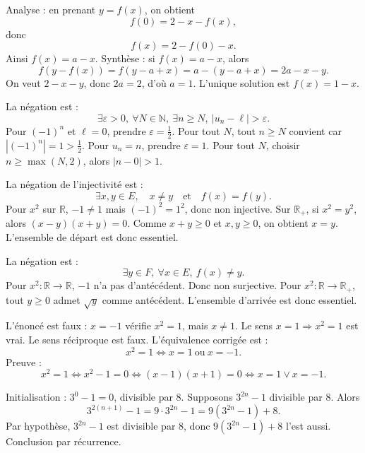 \documentclass[11pt,a4paper]{article}
\newcommand{\N}{\mathbb{N}}
\newcommand{\R}{\mathbb{R}}
\newcommand{\ou}{\vee}
\newcommand{\imp}{\Rightarrow}
\newcommand{\ssi}{\Longleftrightarrow}
\newcommand{\eps}{\varepsilon}
\begin{document}
\begin{correctionbox}[PREP 34]
Analyse : en prenant \(y=f(x)\), on obtient
\[
f(0)=2-x-f(x),
\]
donc
\[
f(x)=2-f(0)-x.
\]
Ainsi \(f(x)=a-x\). Synthèse : si \(f(x)=a-x\), alors
\[
f(y-f(x))=f(y-a+x)=a-(y-a+x)=2a-x-y.
\]
On veut \(2-x-y\), donc \(2a=2\), d'où \(a=1\). L'unique solution est \(f(x)=1-x\).
\end{correctionbox}

\begin{correctionbox}[PREP 35]
La négation est :
\[
\exists \eps>0,\ \forall N\in\N,\ \exists n\geq N,\ |u_n-\ell|>\eps.
\]
Pour \((-1)^n\) et \(\ell=0\), prendre \(\eps=\frac12\). Pour tout \(N\), tout \(n\geq N\) convient car \(|(-1)^n|=1>\frac12\). Pour \(u_n=n\), prendre \(\eps=1\). Pour tout \(N\), choisir \(n\geq\max(N,2)\), alors \(|n-0|>1\).
\end{correctionbox}

\begin{correctionbox}[PREP 36]
La négation de l'injectivité est :
\[
\exists x,y\in E,\quad x\neq y\quad\text{et}\quad f(x)=f(y).
\]
Pour \(x^2\) sur \(\R\), \(-1\neq1\) mais \((-1)^2=1^2\), donc non injective. Sur \(\R_+\), si \(x^2=y^2\), alors \((x-y)(x+y)=0\). Comme \(x+y\geq0\) et \(x,y\geq0\), on obtient \(x=y\). L'ensemble de départ est donc essentiel.
\end{correctionbox}

\begin{correctionbox}[PREP 37]
La négation est :
\[
\exists y\in F,\ \forall x\in E,\ f(x)\neq y.
\]
Pour \(x^2:\R\to\R\), \(-1\) n'a pas d'antécédent. Donc non surjective. Pour \(x^2:\R\to\R_+\), tout \(y\geq0\) admet \(\sqrt y\) comme antécédent. L'ensemble d'arrivée est donc essentiel.
\end{correctionbox}

\begin{correctionbox}[PREP 38]
L'énoncé est faux : \(x=-1\) vérifie \(x^2=1\), mais \(x\neq1\). Le sens \(x=1\imp x^2=1\) est vrai. Le sens réciproque est faux. L'équivalence corrigée est :
\[
x^2=1\ssi x=1\ \text{ou}\ x=-1.
\]
Preuve :
\[
x^2=1\ssi x^2-1=0\ssi (x-1)(x+1)=0\ssi x=1\ou x=-1.
\]
\end{correctionbox}

\begin{correctionbox}[PREP 39]
Initialisation : \(3^0-1=0\), divisible par \(8\). Supposons \(3^{2n}-1\) divisible par \(8\). Alors
\[
3^{2(n+1)}-1=9\cdot3^{2n}-1=9(3^{2n}-1)+8.
\]
Par hypothèse, \(3^{2n}-1\) est divisible par \(8\), donc \(9(3^{2n}-1)+8\) l'est aussi. Conclusion par récurrence.
\end{correctionbox}
\end{document}

